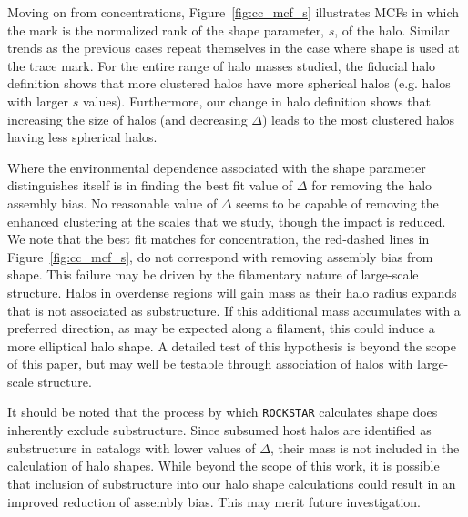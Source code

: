 \documentclass[usenatbib,fleqn]{mnras}
\begin{document}
Moving on from concentrations, Figure~\ref{fig:cc_mcf_s} illustrates MCFs in which the mark is the normalized rank of the shape parameter, $s$, of the halo. Similar trends as the previous cases repeat themselves in the case where shape is used at the trace mark. For the entire range of halo masses studied, the fiducial halo definition shows that more clustered halos have more spherical halos (e.g. halos with larger $s$ values). Furthermore, our change in halo definition shows that increasing the size of halos (and decreasing $\Delta$) leads to the most clustered halos having less spherical halos.

Where the environmental dependence associated with the shape parameter distinguishes itself is in finding the best fit value of $\Delta$ for removing the halo assembly bias. No reasonable value of $\Delta$ seems to be
capable of removing the enhanced clustering at the scales that we study, though the impact is reduced. We note that the best fit matches for concentration, the red-dashed lines in Figure~\ref{fig:cc_mcf_s}, do not correspond with removing assembly bias from shape. This failure may be driven by the filamentary nature of large-scale structure. Halos in overdense regions will gain mass as their halo radius expands that is not associated as substructure. If this additional mass accumulates with a preferred direction, as may be expected along a filament, this could induce a more elliptical halo shape. A detailed test of this hypothesis is beyond the scope of this paper, but may well be testable through association of halos with large-scale structure.

It should be noted that the process by which {\tt ROCKSTAR} calculates shape does inherently exclude substructure. Since subsumed host halos are identified as substructure in catalogs with lower values of $\Delta$, their mass is not included in the calculation of halo shapes. While beyond the scope of this work, it is possible that inclusion of substructure into our halo shape calculations could result in an improved reduction of assembly bias. This may merit future investigation.
\end{document}
